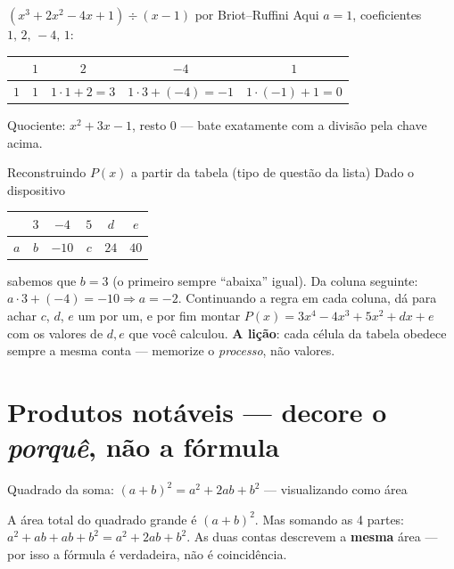 \documentclass[12pt,a4paper]{article}
\begin{document}
\begin{exemplo}{$(x^3+2x^2-4x+1)\div(x-1)$ por Briot--Ruffini}
Aqui $a=1$, coeficientes $1,\,2,\,-4,\,1$:
\begin{center}
\begin{tabular}{c|cccc}
 & $1$ & $2$ & $-4$ & $1$\\
\hline
$1$ & $1$ & $1\cdot1+2=3$ & $1\cdot3+(-4)=-1$ & $1\cdot(-1)+1=0$
\end{tabular}
\end{center}
Quociente: $x^2+3x-1$, resto $0$ — bate exatamente com a divisão pela
chave acima.
\end{exemplo}

\begin{exemplo}{Reconstruindo $P(x)$ a partir da tabela (tipo de questão da lista)}
Dado o dispositivo
\begin{center}
\begin{tabular}{c|ccccc}
 & $3$ & $-4$ & $5$ & $d$ & $e$\\
\hline
$a$ & $b$ & $-10$ & $c$ & $24$ & $40$
\end{tabular}
\end{center}
sabemos que $b=3$ (o primeiro sempre ``abaixa'' igual). Da coluna seguinte:
$a\cdot 3+(-4)=-10 \Rightarrow a=-2$. Continuando a regra em cada coluna, dá
para achar $c$, $d$, $e$ um por um, e por fim montar
$P(x)=3x^4-4x^3+5x^2+dx+e$ com os valores de $d,e$ que você calculou.
\textbf{A lição}: cada célula da tabela obedece sempre a mesma conta —
memorize o \emph{processo}, não valores.
\end{exemplo}

\section{Produtos notáveis — decore o \emph{porquê}, não a fórmula}

\begin{exemplo}{Quadrado da soma: $(a+b)^2 = a^2+2ab+b^2$ — visualizando como área}
\begin{center}
\end{center}
A área total do quadrado grande é $(a+b)^2$. Mas somando as 4 partes:
$a^2 + ab+ab+b^2 = a^2+2ab+b^2$. As duas contas descrevem a \textbf{mesma}
área — por isso a fórmula é verdadeira, não é coincidência.
\end{exemplo}
\end{document}
